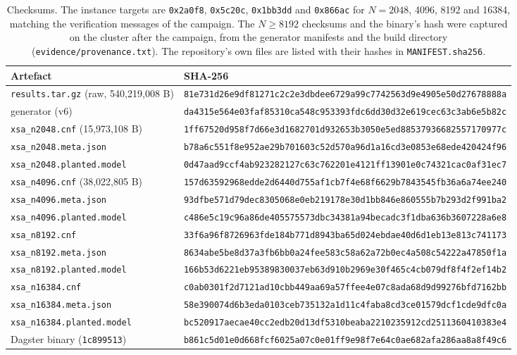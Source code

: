 \documentclass[11pt,a4paper]{article}
\begin{document}
\begin{table}[htbp]
\centering\scriptsize
\begin{tabular}{@{}p{}p{}@{}}
\toprule
Artefact & SHA-256 \\
\midrule
\texttt{results.tar.gz} (raw, 540{,}219{,}008 B) & \texttt{81e731d26e9df81271c2c2e3dbdee6729a99c7742563d9e4905e50d27678888a} \\
generator (v6) & \texttt{da4315e564e03faf85310ca548c953393fdc6dd30d32e619cec63c3ab6e5b82c} \\
\addlinespace
\texttt{xsa\_n2048.cnf} (15{,}973{,}108 B) & \texttt{1ff67520d958f7d66e3d1682701d932653b3050e5ed88537936682557170977c} \\
\texttt{xsa\_n2048.meta.json} & \texttt{b78a6c551f8e952ae29b701603c52d570a96d1a16cd3e0853e68ede420424f96} \\
\texttt{xsa\_n2048.planted.model} & \texttt{0d47aad9ccf4ab923282127c63c762201e4121ff13901e0c74321cac0af31ec7} \\
\texttt{xsa\_n4096.cnf} (38{,}022{,}805 B) & \texttt{157d63592968edde2d6440d755af1cb7f4e68f6629b7843545fb36a6a74ee240} \\
\texttt{xsa\_n4096.meta.json} & \texttt{93dfbe571d79dec8305068e0eb219178e30d1bb846e860555b7b293d2f991ba2} \\
\texttt{xsa\_n4096.planted.model} & \texttt{c486e5c19c96a86de405575573dbc34381a94becadc3f1dba636b3607228a6e8} \\
\texttt{xsa\_n8192.cnf} & \texttt{33f6a96f8726963fde184b771d8943ba65d024ebdae40d6d1eb13e813c741173} \\
\texttt{xsa\_n8192.meta.json} & \texttt{8634abe5be8d37a3fb6bb0a24fee583c58a62a72b0ec4a508c54222a47850f1a} \\
\texttt{xsa\_n8192.planted.model} & \texttt{166b53d6221eb95389830037eb63d910b2969e30f465c4cb079df8f4f2ef14b2} \\
\texttt{xsa\_n16384.cnf} & \texttt{c0ab0301f2d7121ad10cbb449aa69a57ffee4e07c8ada68d9d99276bfd7162bb} \\
\texttt{xsa\_n16384.meta.json} & \texttt{58e390074d6b3eda0103ceb735132a1d11c4faba8cd3ce01579dcf1cde9dfc0a} \\
\texttt{xsa\_n16384.planted.model} & \texttt{bc520917aecae40cc2edb20d13df5310beaba2210235912cd2511360410383e4} \\
\addlinespace
Dagster binary (\texttt{1c899513}) & \texttt{b861c5d01e0d668fcf6025a07c0e01ff9e98f7e64c0ae682afa286aa8a8f49c6} \\
\bottomrule
\end{tabular}
\caption{Checksums. The instance targets are \texttt{0x2a0f8}, \texttt{0x5c20c},
\texttt{0x1bb3dd} and \texttt{0x866ac} for $N=2048$, 4096, 8192 and 16384, matching the
verification messages of the campaign. The $N\ge 8192$ checksums and the binary's hash were
captured on the cluster after the campaign, from the generator manifests and the build directory
(\texttt{evidence/provenance.txt}). The repository's own files are listed with their hashes in
\texttt{MANIFEST.sha256}.}
\label{tab:checksums}
\end{table}
\end{document}
